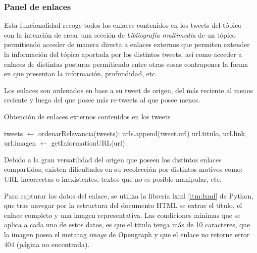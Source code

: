 \subsubsection{Panel de enlaces}

Esta funcionalidad recoge todos los enlaces contenidos en los tweets del tópico con la intención de crear una sección de \emph{bibliografía multimedia} de un tópico permitiendo acceder de manera directa a enlaces externos que permiten extender la información del tópico aportada por los distintos tweets, así como acceder a enlaces de distintas posturas permitiendo entre otras cosas contraponer la forma en que presentan la información, profundidad, etc.

Los enlaces son ordenados en base a su tweet de origen, del más reciente al menos reciente y luego del que posee más re-tweets al que posee menos.

\begin{algorithm}
	\caption{Obtención de enlaces externos contenidos en los tweets}\label{getURLAlgo}
	\begin{algorithmic}[H]
		tweets $\gets$ ordenarRelevancia(tweets);
				\State urls.append(tweet.url)
			\EndIf
		\EndFor
			\State url.titulo, url.link, url.imagen $\gets$ getInformationURL(url)
		\EndFor 
		\EndFunction

	\end{algorithmic}
\end{algorithm}

Debido a la gran versatilidad del origen que poseen los distintos enlaces compartidos, existen dificultades en su recolección por distintos motivos como: URL incorrectas o inexistentes, textos que no es posible manipular, etc.

Para capturar los datos del enlace, se utiliza la librería lxml \ref{itm:lxml} de Python, que tras navegar por la estructura del documento HTML se extrae el título, el enlace completo y una imagen representativa. Las condiciones mínimas que se aplica a cada uno de estos datos, es que el titulo tenga más de 10 caracteres, que la imagen posea el metatag \emph{image} de Opengraph \cite{openGraphProtocol} y que el enlace no retorne error 404 (página no encontrada).


	
	   